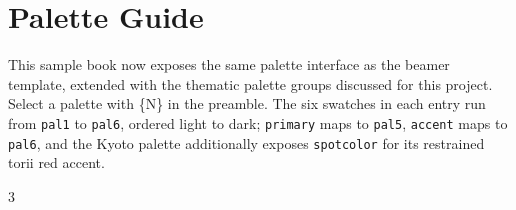 \chapter*{Palette Guide}

This sample book now exposes the same palette interface as the beamer template,
extended with the thematic palette groups discussed for this project. Select a
palette with \{N\} in the preamble. The six swatches in
each entry run from \texttt{pal1} to \texttt{pal6}, ordered light to dark;
\texttt{primary} maps to \texttt{pal5}, \texttt{accent} maps to \texttt{pal6},
and the Kyoto palette additionally exposes \texttt{spotcolor} for its restrained
torii red accent.

\begin{fullwidth}
\scriptsize
\begin{multicols}{3}
\raggedcolumns
\bookpaletteguideentries
\end{multicols}
\end{fullwidth}



